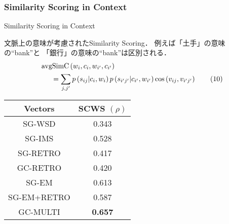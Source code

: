 \documentclass[10pt,usepdftitle=false,hyperref={unicode}]{beamer}
\DeclareMathOperator*{\avgSimC}{avgSimC}
\newenvironment{wideenumerate}{\enumerate\addtolength{\itemsep}{1em}}{\endenumerate}
\newcommand{\parentheses}[1]{\left(#1\right)}
\begin{document}
\begin{frame}
\frametitle{Similarity Scoring in Context}
\begin{wideenumerate}
\setcounter{enumi}{2}
    \item Similarity Scoring in Context

        文脈上の意味が考慮されたSimilarity Scoring．
        例えば「土手」の意味の“bank”と
        「銀行」の意味の“bank”は区別される．
        \begin{align}
        &\avgSimC\parentheses{w_i,c_i,w_{i'},c_{i'}} \notag \\
        &\phantom{==}= \sum_{j,j'} p\parentheses{s_{ij}|c_i,w_i} p\parentheses{s_{i'j'}|c_{i'},w_{i'}}\cos\parentheses{v_{ij},v_{i'j'}}
        \tag{10}
        \end{align}

        \begin{center}
            \begin{algfont}
                {\renewcommand{\arraystretch}{1.5}
                    {\scriptsize
                        \begin{tabular}{|c|c|}
                            \hline
                            Vectors     & SCWS $(\rho)$ \\
                            \hline
                            SG-WSD      & 0.343      \\
                            SG-IMS      & 0.528      \\
                            SG-RETRO    & 0.417      \\
                            GC-RETRO    & 0.420      \\
                            SG-EM       & 0.613      \\
                            SG-EM+RETRO & 0.587      \\
                            GC-MULTI    & \textbf{0.657} \\
                            \hline
                        \end{tabular}
                    }
                }
            \end{algfont}
        \end{center}
\end{wideenumerate}
\end{frame}
\end{document}
